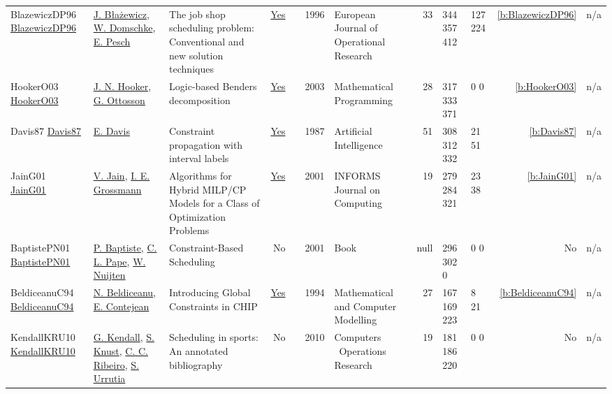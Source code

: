 {\begin{longtable}{>{\raggedright\arraybackslash}p{3cm}>{\raggedright\arraybackslash}p{4.5cm}>{\raggedright\arraybackslash}p{6.0cm}rrrp{2.5cm}rp{1cm}p{1cm}rr}
BlazewiczDP96 \href{http://dx.doi.org/10.1016/0377-2217(95)00362-2}{BlazewiczDP96} & \hyperref[auth:a976]{J. Błażewicz}, \hyperref[auth:a977]{W. Domschke}, \hyperref[auth:a438]{E. Pesch} & The job shop scheduling problem: Conventional and new solution techniques & \href{../works/BlazewiczDP96.pdf}{Yes} & \cite{BlazewiczDP96} & 1996 & European Journal of Operational Research & 33 & 344 357 412 & 127 224 & \ref{b:BlazewiczDP96} & n/a\\
HookerO03 \href{http://dx.doi.org/10.1007/s10107-003-0375-9}{HookerO03} & \hyperref[auth:a160]{J. N. Hooker}, \hyperref[auth:a852]{G. Ottosson} & \cellcolor{green!10}Logic-based Benders decomposition & \href{../works/HookerO03.pdf}{Yes} & \cite{HookerO03} & 2003 & Mathematical Programming & 28 & 317 333 371 & 0 0 & \ref{b:HookerO03} & n/a\\
Davis87 \href{http://dx.doi.org/10.1016/0004-3702(87)90091-9}{Davis87} & \hyperref[auth:a1216]{E. Davis} & \cellcolor{gold!20}Constraint propagation with interval labels & \href{../works/Davis87.pdf}{Yes} & \cite{Davis87} & 1987 & Artificial Intelligence & 51 & 308 312 332 & 21 51 & \ref{b:Davis87} & n/a\\
JainG01 \href{http://dx.doi.org/10.1287/ijoc.13.4.258.9733}{JainG01} & \hyperref[auth:a844]{V. Jain}, \hyperref[auth:a382]{I. E. Grossmann} & Algorithms for Hybrid MILP/CP Models for a Class of Optimization Problems & \href{../works/JainG01.pdf}{Yes} & \cite{JainG01} & 2001 & \cellcolor{red!20}INFORMS Journal on Computing & 19 & 279 284 321 & 23 38 & \ref{b:JainG01} & n/a\\
BaptistePN01 \href{http://dx.doi.org/10.1007/978-1-4615-1479-4}{BaptistePN01} & \hyperref[auth:a162]{P. Baptiste}, \hyperref[auth:a163]{C. L. Pape}, \hyperref[auth:a656]{W. Nuijten} & Constraint-Based Scheduling & No & \cite{BaptistePN01} & 2001 & Book & null & 296 302 0 & 0 0 & No & n/a\\
BeldiceanuC94 \href{https://www.sciencedirect.com/science/article/pii/0895717794901279}{BeldiceanuC94} & \hyperref[auth:a128]{N. Beldiceanu}, \hyperref[auth:a784]{E. Contejean} & \cellcolor{gold!20}Introducing Global Constraints in {CHIP} & \href{../works/BeldiceanuC94.pdf}{Yes} & \cite{BeldiceanuC94} & 1994 & Mathematical and Computer Modelling & 27 & 167 169 223 & 8 21 & \ref{b:BeldiceanuC94} & n/a\\
KendallKRU10 \href{http://dx.doi.org/10.1016/j.cor.2009.05.013}{KendallKRU10} & \hyperref[auth:a1388]{G. Kendall}, \hyperref[auth:a1167]{S. Knust}, \hyperref[auth:a1387]{C. C. Ribeiro}, \hyperref[auth:a1389]{S. Urrutia} & Scheduling in sports: An annotated bibliography & No & \cite{KendallKRU10} & 2010 & Computers \  Operations Research & 19 & 181 186 220 & 0 0 & No & n/a\\

\end{longtable}}
